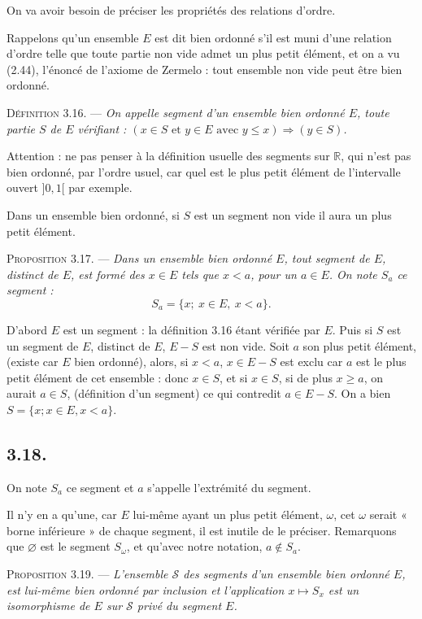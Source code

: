 
On va avoir besoin de préciser les propriétés des relations d'ordre.

Rappelons qu'un ensemble $E$ est dit bien ordonné s'il est muni d'une relation d'ordre telle que toute partie non vide admet un plus petit élément, et on a vu (2.44), l'énoncé de l'axiome de Zermelo : tout ensemble non vide peut être bien ordonné.

\medskip\noindent\textsc{Définition 3.16.} --- \emph{On appelle segment d'un ensemble bien ordonné $E$, toute partie $S$ de $E$ vérifiant : $(x\in S\text{ et }y\in E\text{ avec }y\le x)\Rightarrow(y\in S)$.}

Attention : ne pas penser à la définition usuelle des segments sur $\mathbb R$, qui n'est pas bien ordonné, par l'ordre usuel, car quel est le plus petit élément de l'intervalle ouvert $]0,1[$ par exemple.

Dans un ensemble bien ordonné, si $S$ est un segment non vide il aura un plus petit élément.

\medskip\noindent\textsc{Proposition 3.17.} --- \emph{Dans un ensemble bien ordonné $E$, tout segment de $E$, distinct de $E$, est formé des $x\in E$ tels que $x<a$, pour un $a\in E$. On note $S_a$ ce segment :}
\[
S_a=\{x;\ x\in E,\ x<a\}.
\]

D'abord $E$ est un segment : la définition 3.16 étant vérifiée par $E$. Puis si $S$ est un segment de $E$, distinct de $E$, $E-S$ est non vide. Soit $a$ son plus petit élément, (existe car $E$ bien ordonné), alors, si $x<a$, $x\in E-S$ est exclu car $a$ est le plus petit élément de cet ensemble : donc $x\in S$, et si $x\in S$, si de plus $x\ge a$, on aurait $a\in S$, (définition d'un segment) ce qui contredit $a\in E-S$. On a bien $S=\{x;x\in E,x<a\}$. \bookend

\subsection*{3.18.}
On note $S_a$ ce segment et $a$ s'appelle l'extrémité du segment.

Il n'y en a qu'une, car $E$ lui-même ayant un plus petit élément, $\omega$, cet $\omega$ serait « borne inférieure » de chaque segment, il est inutile de le préciser. Remarquons que $\varnothing$ est le segment $S_\omega$, et qu'avec notre notation, $a\notin S_a$.

\medskip\noindent\textsc{Proposition 3.19.} --- \emph{L'ensemble $\mathcal S$ des segments d'un ensemble bien ordonné $E$, est lui-même bien ordonné par inclusion et l'application $x\mapsto S_x$ est un isomorphisme de $E$ sur $\mathcal S$ privé du segment $E$.}

